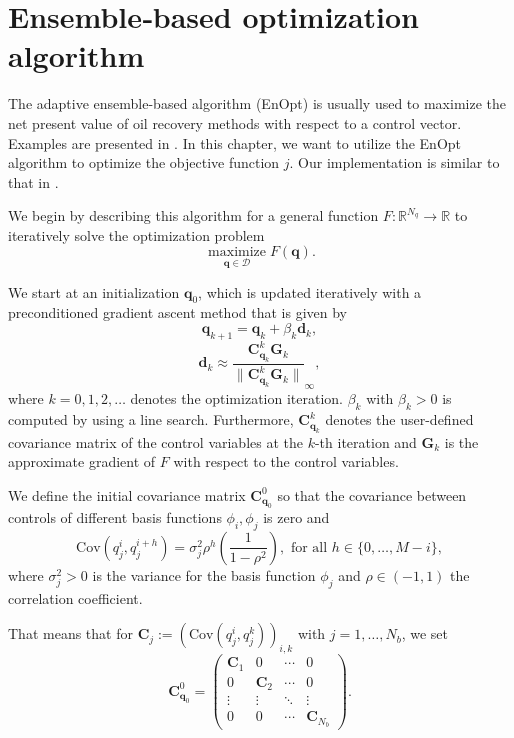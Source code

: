 \chapter{ Ensemble‑based optimization algorithm}

The adaptive ensemble-based algorithm (EnOpt) is usually used to maximize the net present value of oil recovery methods with respect to a control vector. Examples are presented in \cite{Keil2022-dj, OGUNTOLA2021109165, Zhang2023-sg}. In this chapter, we want to utilize the EnOpt algorithm to optimize the objective function $j$. Our implementation is similar to that in \cite{Keil2022-dj}.

We begin by describing this algorithm for a general function $F:\mathbb{R}^{N_q}\to \mathbb{R}$ to iteratively solve the optimization problem
\begin{displaymath}
\operatorname*{maximize}_{\mathbf{q}\in\mathcal{D}}F(\mathbf{q}).
\end{displaymath}

We start at an initialization $\mathbf{q}_0$,  which is updated iteratively with a preconditioned gradient ascent method that is given by
\begin{displaymath}
\mathbf{q}_{k+1} = \mathbf{q}_k+\beta_k\mathbf{d}_k,
\end{displaymath}
\begin{displaymath}
\mathbf{d}_k\approx\frac{\mathbf{C}_{\mathbf{q}_k}^k\mathbf{G}_k}{\|\mathbf{C}_{\mathbf{q}_k}^k\mathbf{G}_k\|}_\infty,
\end{displaymath}
where $k=0,1,2,\dotsc$ denotes the optimization iteration. $\beta_k$ with $\beta_k>0$ is computed by using a line search. Furthermore, $\mathbf{C}_{\mathbf{q}_k}^k$ denotes the user-defined covariance matrix of the control variables at the $k$-th iteration and $\mathbf{G}_k$ is the approximate gradient of $F$ with respect to the control variables.

We define the initial covariance matrix $\mathbf{C}_{\mathbf{q}_0}^0$ so that the covariance between controls of different basis functions $\phi_i,\phi_j$ is zero and
\begin{displaymath}
\mathrm{Cov}(q_j^i,q_j^{i+h})=\sigma_j^2\rho^h\left(\frac{1}{1-\rho^2}\right),\text{ for all }h\in\{0,\dotsc,M-i\},
\end{displaymath}
where $\sigma_j^2>0$ is the variance for the basis function $\phi_j$ and $\rho\in(-1,1)$ the correlation coefficient.

That means that for $\mathbf{C}_j:=\left(\mathrm{Cov}(q_j^i,q_j^{k})\right)_{i,k}$ with $j=1,\dotsc,N_b$, we set
\begin{equation}
\label{initCov}
\mathbf{C}_{\mathbf{q}_0}^0 =
\begin{pmatrix}
  \mathbf{C}_1 & 0 & \cdots & 0 \\
  0 & \mathbf{C}_2 & \cdots & 0 \\
  \vdots  & \vdots  & \ddots & \vdots  \\
  0 & 0 & \cdots & \mathbf{C}_{N_b} 
 \end{pmatrix}.
\end{equation}

